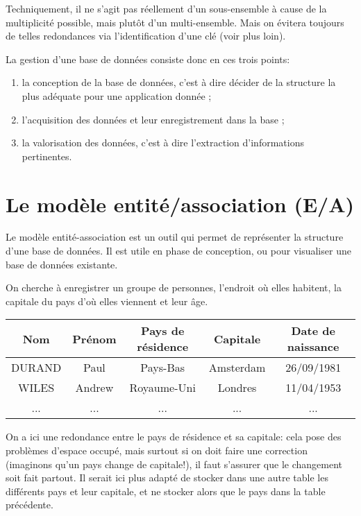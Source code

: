 \documentclass[a4paper]{scrartcl}
\begin{document}
		\rem Techniquement, il ne s'agit pas réellement d'un sous-ensemble à cause de la multiplicité possible, mais plutôt d'un multi-ensemble.
		Mais on évitera toujours de telles redondances via l'identification d'une clé (voir plus loin).

		La gestion d'une base de données consiste donc en ces trois points:
		\begin{enumerate}
			\item la conception de la base de données, c'est à dire décider de la structure la plus adéquate pour une application donnée ;
			\item l'acquisition des données et leur enregistrement dans la base ;
			\item la valorisation des données, c'est à dire l'extraction d'informations pertinentes.
		\end{enumerate}

	\section{Le modèle entité/association (E/A)}
		Le modèle entité-association est un outil qui permet de représenter la structure d'une base de données. 
		Il est utile en phase de conception, ou pour visualiser une base de données existante.

		\exemple On cherche à enregistrer un groupe de personnes, l'endroit où elles habitent, la capitale du pays d'où elles viennent et leur âge.

		\begin{center}
		\begin{tabular}{|c|c|c|c|c|}
			\hline
			Nom & Prénom & Pays de résidence & Capitale & Date de naissance \\
			\hline
			DURAND & Paul & Pays-Bas & Amsterdam & 26/09/1981 \\
			\hline
			WILES & Andrew & Royaume-Uni & Londres & 11/04/1953 \\
			\hline
			... & ... & ... & ... & ... \\
			\hline
		\end{tabular}
		\end{center}

		\rem On a ici une redondance entre le pays de résidence et sa capitale: cela pose des problèmes d'espace occupé,
		mais surtout si on doit faire une correction (imaginons qu'un pays change de capitale!), il faut s'assurer que
		le changement soit fait partout. Il serait ici plus adapté de stocker dans une autre table les différents pays
		et leur capitale, et ne stocker alors que le pays dans la table précédente.
\end{document}
